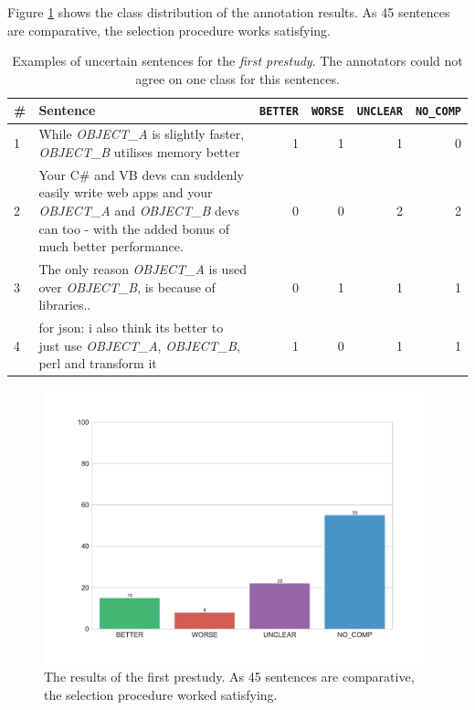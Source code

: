 Figure \ref{fig:dist_pre_a} shows the class distribution of the annotation results. As 45  sentences are comparative, the selection procedure works satisfying.


\begin{table}[htbp]
\centering
\caption{Examples of uncertain sentences for the \emph{first prestudy}. The annotators could not agree on one class for this sentences. }
\label{tbl:pre_1_res}
\begin{tabularx}{\textwidth}{lXrrrr}
\toprule
\# & Sentence        & \texttt{BETTER} & \texttt{WORSE} & \texttt{UNCLEAR} & \texttt{NO\_COMP}          \\ \midrule

1&While \emph{OBJECT\_A} is slightly faster, \emph{OBJECT\_B} utilises memory better & 1 & 1 & 1 & 0 \\

2&Your C\# and VB devs can suddenly easily write web apps and your \emph{OBJECT\_A} and \emph{OBJECT\_B} devs can too - with the added bonus of much better performance. & 0 & 0 & 2 & 2 \\

3&The only reason \emph{OBJECT\_A} is used over \emph{OBJECT\_B}, is because of libraries.. & 0 & 1 & 1 & 1 \\

4&for json: i also think its better to just use \emph{OBJECT\_A}, \emph{OBJECT\_B}, perl and transform it & 1 & 0 & 1 & 1 \\

\bottomrule                              
\end{tabularx}
\end{table}

\begin{figure}[htbp]
\centering
\caption{The results of the first prestudy. As 45  sentences are comparative, the selection procedure worked satisfying.}
\label{fig:dist_pre_a}
\includegraphics[width=0.8\linewidth]{images/dataset/prea-dist}
\end{figure}
\FloatBarrier


